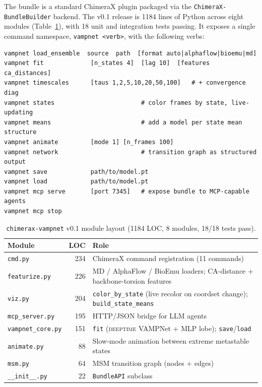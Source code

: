 \documentclass[11pt]{article}
\begin{document}
The bundle is a standard ChimeraX plugin packaged via the
\texttt{ChimeraX-BundleBuilder} backend. The v0.1 release is 1184 lines
of Python across eight modules (Table~\ref{tab:modules}), with 18 unit
and integration tests passing. It exposes a single command namespace,
\texttt{vampnet \textless verb\textgreater}, with the following verbs:

\begin{lstlisting}[caption={\texttt{chimerax-vampnet} command surface
  (CLI; each command also reachable via the bundled MCP HTTP/JSON bridge
  and the v0.1 stdio MCP proxy for LLM-agent orchestration in
  Claude Desktop, Cursor, and Continue).}]
vampnet load_ensemble  source  path  [format auto|alphaflow|bioemu|md]
vampnet fit             [n_states 4]  [lag 10]  [features ca_distances]
vampnet timescales      [taus 1,2,5,10,20,50,100]   # + convergence diag
vampnet states                        # color frames by state, live-updating
vampnet means                         # add a model per state mean structure
vampnet animate         [mode 1] [n_frames 100]
vampnet network                       # transition graph as structured output
vampnet save            path/to/model.pt
vampnet load            path/to/model.pt
vampnet mcp serve       [port 7345]   # expose bundle to MCP-capable agents
vampnet mcp stop
\end{lstlisting}

\begin{table}[h]
\centering
\caption{\texttt{chimerax-vampnet} v0.1 module layout (1184 LOC,
8 modules, 18/18 tests pass).}
\label{tab:modules}
\small
\begin{tabularx}{\linewidth}{l r X}
\toprule
\textbf{Module} & \textbf{LOC} & \textbf{Role} \\
\midrule
\texttt{cmd.py}          & 234 & ChimeraX command registration (11 commands) \\
\texttt{featurize.py}    & 226 & MD / AlphaFlow / BioEmu loaders; CA-distance + backbone-torsion features \\
\texttt{viz.py}          & 204 & \texttt{color\_by\_state} (live recolor on coordset change); \texttt{build\_state\_means} \\
\texttt{mcp\_server.py}  & 195 & HTTP/JSON bridge for LLM agents \\
\texttt{vampnet\_core.py} & 151 & \texttt{fit} (\textsc{deeptime} VAMPNet + MLP lobe); \texttt{save}/\texttt{load} \\
\texttt{animate.py}      & 88  & Slow-mode animation between extreme metastable states \\
\texttt{msm.py}          & 64  & MSM transition graph (nodes + edges) \\
\texttt{\_\_init\_\_.py} & 22  & \texttt{BundleAPI} subclass \\
\bottomrule
\end{tabularx}
\end{table}
\end{document}
